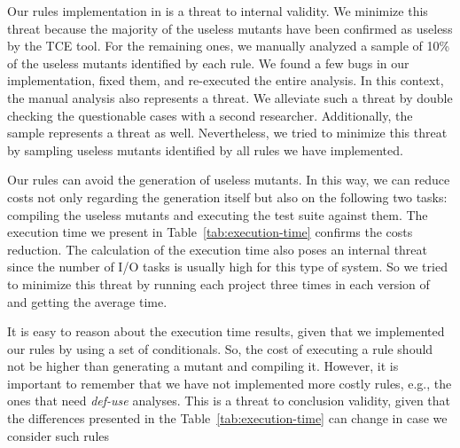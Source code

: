 Our rules implementation in \mujava{} is a threat to internal validity. 
We minimize this threat because the majority of the useless mutants have been confirmed as useless by the TCE tool. 
For the remaining ones, we manually analyzed a sample of 10\% of the useless mutants identified by each rule. 
We found a few bugs in our implementation, fixed them, and re-executed the entire analysis. 
In this context, the manual analysis also represents a threat. 
We alleviate such a threat by double checking the questionable cases with a second researcher. 
Additionally, the sample represents a threat as well. 
Nevertheless, we tried to minimize this threat by sampling useless mutants identified by all rules we have implemented.

Our rules can avoid the generation of useless mutants. 
In this way, we can reduce costs not only regarding the generation itself but also on the following two tasks: compiling the useless mutants and executing the test suite against them. 
The execution time we present in Table~\ref{tab:execution-time} confirms the costs reduction. 
The calculation of the execution time also poses an internal threat since the number of I/O tasks is usually high for this type of system. 
So we tried to minimize this threat by running each project three times in each version of \mujava{} and getting the average time.

It is easy to reason about the execution time results, given that we implemented our rules by using a set of conditionals. 
So, the cost of executing a rule should not be higher than generating a mutant and compiling it. 
However, it is important to remember that we have not implemented more costly rules, e.g., the ones that need \textit{def-use} analyses. 
This is a threat to conclusion validity, given that the differences presented in the Table~\ref{tab:execution-time} can change in case we consider such rules 





